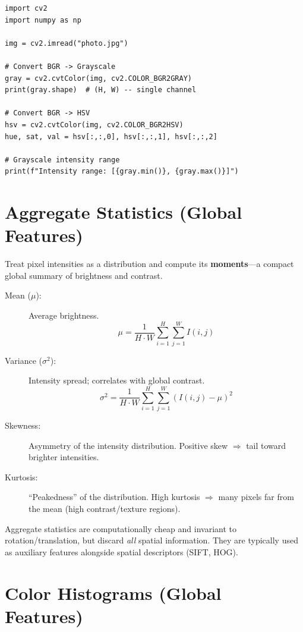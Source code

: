 \begin{lstlisting}[style=pythonstyle]
import cv2
import numpy as np

img = cv2.imread("photo.jpg")

# Convert BGR -> Grayscale
gray = cv2.cvtColor(img, cv2.COLOR_BGR2GRAY)
print(gray.shape)  # (H, W) -- single channel

# Convert BGR -> HSV
hsv = cv2.cvtColor(img, cv2.COLOR_BGR2HSV)
hue, sat, val = hsv[:,:,0], hsv[:,:,1], hsv[:,:,2]

# Grayscale intensity range
print(f"Intensity range: [{gray.min()}, {gray.max()}]")
\end{lstlisting}

\section*{Aggregate Statistics (Global Features)}

Treat pixel intensities as a distribution and compute its \textbf{moments}---a compact global summary of brightness and contrast.

\begin{description}
    \item[Mean ($\mu$):] Average brightness.
    $$ \mu = \frac{1}{H \cdot W} \sum_{i=1}^{H} \sum_{j=1}^{W} I(i,j) $$

    \item[Variance ($\sigma^2$):] Intensity spread; correlates with global contrast.
    $$ \sigma^2 = \frac{1}{H \cdot W} \sum_{i=1}^{H} \sum_{j=1}^{W} (I(i,j) - \mu)^2 $$

    \item[Skewness:] Asymmetry of the intensity distribution. Positive skew $\Rightarrow$ tail toward brighter intensities.

    \item[Kurtosis:] ``Peakedness'' of the distribution. High kurtosis $\Rightarrow$ many pixels far from the mean (high contrast/texture regions).
\end{description}

\begin{remark}
Aggregate statistics are computationally cheap and invariant to rotation/translation, but discard \textit{all} spatial information. They are typically used as auxiliary features alongside spatial descriptors (SIFT, HOG).
\end{remark}

\section*{Color Histograms (Global Features)}


